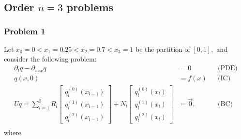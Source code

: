 \documentclass[11pt,reqno,oneside,a4paper]{article}
\theoremstyle{plain} %
\theoremstyle{definition}
\theoremstyle{remark}
\begin{document}
	
\subsection*{Order $n = 3$ problems}
\subsubsection*{Problem 1}
Let $x_0 = 0 < x_1  = 0.25 < x_2 = 0.7 < x_3 = 1$ be the partition of $[0,1],$ and consider the following problem:
\begin{align*}
\partial_t q - \partial_{xxx} q &= 0 &&\text{(PDE)} \\
q(x, 0) &= f(x) &&\text{(IC)} \\
Uq = \sum^3_{l=1} R_l \begin{bmatrix} q_l^{(0)}(x_{l-1}) \\ q_l^{(1)}(x_{l-1}) \\ q_l^{(2)}(x_{l-1})  \end{bmatrix} + N_l \begin{bmatrix} q_l^{(0)}(x_{l}) \\ q_l^{(1)}(x_{l}) \\ q_l^{(2)}(x_{l}) \end{bmatrix} &= \vec{0}, &&\text{(BC)} \\
\end{align*}
where 
\end{document}
